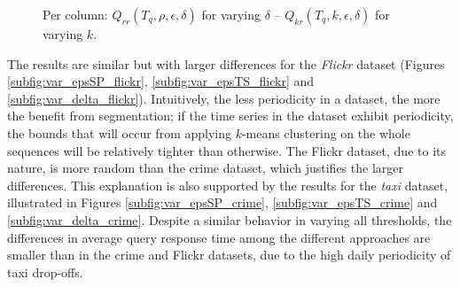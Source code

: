 \begin{figure}[!tb]
 \quad
{}
\caption{Per column: $Q_{rr}(T_q, \rho, \epsilon, \delta)$ for varying $\delta$ -- $Q_{kr}(T_q, k, \epsilon, \delta)$ for varying $k$.}
\label{fig:exp1_sim}
\end{figure}

The results are similar but with larger differences for the {\em Flickr} dataset (Figures \ref{subfig:var_epsSP_flickr}, \ref{subfig:var_epsTS_flickr} and \ref{subfig:var_delta_flickr}). Intuitively, the less periodicity in a dataset, the more the benefit from segmentation; if the time series in the dataset exhibit periodicity, the bounds that will occur from applying $k$-means clustering on the whole sequences will be relatively tighter than otherwise. The Flickr dataset, due to its nature, is more random than the crime dataset, which justifies the larger differences. This explanation is also supported by the results for the {\em taxi} dataset, illustrated in Figures \ref{subfig:var_epsSP_crime}, \ref{subfig:var_epsTS_crime} and \ref{subfig:var_delta_crime}. Despite a similar behavior in varying all thresholds, the differences in average query response time among the different approaches are smaller than in the crime and Flickr datasets, due to the high daily periodicity of taxi drop-offs.

